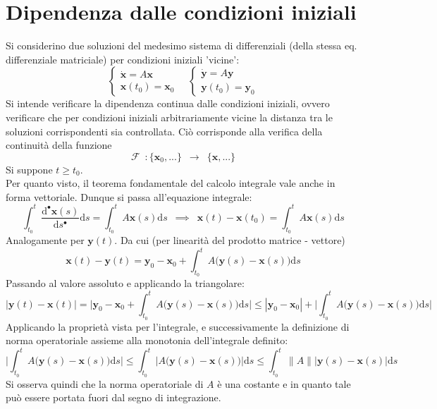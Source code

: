 \documentclass[10pt, oneside]{book}
\theoremstyle{plain}
\begin{document}
\section{Dipendenza dalle condizioni iniziali}
Si considerino due soluzioni del medesimo sistema di differenziali (della stessa eq. differenziale matriciale) per condizioni iniziali 'vicine':
\[\begin{cases}
\dot{\mathbf{x}} = A \mathbf{x}\\
\mathbf{x}(t_0) = \mathbf{x}_0
\end{cases} \quad \begin{cases}
\dot{\mathbf{y}} = A \mathbf{y}\\
\mathbf{y}(t_0) = \mathbf{y}_0
\end{cases}\]
Si intende verificare la dipendenza continua dalle condizioni iniziali, ovvero verificare che per condizioni iniziali arbitrariamente vicine la distanza tra le soluzioni corrispondenti sia controllata. Ciò corrisponde alla verifica della continuità della funzione
\[\mathcal{F} \enspace : \{\mathbf{x}_0, ...\} \enspace \rightarrow \enspace \{\mathbf{x}, ...\}\]
Si suppone $t \geq t_0$.
\\Per quanto visto, il teorema fondamentale del calcolo integrale vale anche in forma vettoriale. Dunque si passa all'equazione integrale:
\[\int_{t_0}^{t}\frac{\textrm{d}^{•} \mathbf{x}(s)}{\textrm{d}s^{•}}\textrm{d}s = \int_{t_0}^{t}A \mathbf{x}(s)\textrm{d}s \enspace \implies \enspace \mathbf{x}(t) - \mathbf{x}(t_0) = \int_{t_0}^{t}A \mathbf{x}(s)\textrm{d}s\]
Analogamente per $\mathbf{y}(t)$. Da cui (per linearità del prodotto matrice - vettore)
\[\mathbf{x}(t) - \mathbf{y}(t) = \mathbf{y}_0 - \mathbf{x}_0 + \int_{t_0}^{t}A \big( \mathbf{y}(s) - \mathbf{x}(s)\big)\textrm{d}s\]
Passando al valore assoluto e applicando la triangolare:
\[|\mathbf{y}(t) - \mathbf{x}(t)| = \bigg|\mathbf{y}_0 - \mathbf{x}_0 + \int_{t_0}^{t}A \big( \mathbf{y}(s) - \mathbf{x}(s)\big)\textrm{d}s\bigg| \leq | \mathbf{y}_0 - \mathbf{x}_0 | + \bigg|\int_{t_0}^{t}A \big( \mathbf{y}(s) - \mathbf{x}(s)\big)\textrm{d}s \bigg|\]
Applicando la proprietà vista per l'integrale, e successivamente la definizione di norma operatoriale assieme alla monotonia dell'integrale definito:
\[\bigg|\int_{t_0}^{t}A \big( \mathbf{y}(s) - \mathbf{x}(s)\big)\textrm{d}s \bigg| \leq \int_{t_0}^{t} \big| A \big( \mathbf{y}(s) - \mathbf{x}(s)\big)\big|\textrm{d}s \leq \int_{t_0}^{t} \| A \| \big| \mathbf{y}(s) - \mathbf{x}(s)\big| \textrm{d}s\]
Si osserva quindi che la norma operatoriale di $A$ è una costante e in quanto tale può essere portata fuori dal segno di integrazione.
\end{document}
